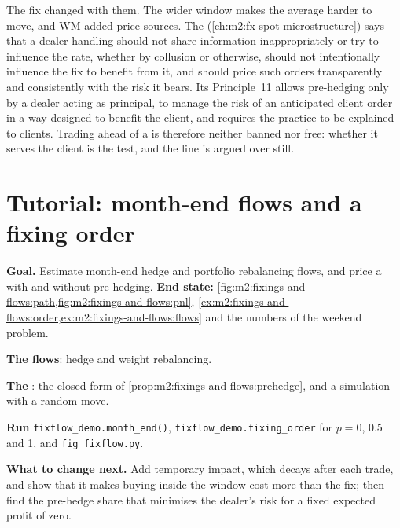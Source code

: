 The fix changed with them. The wider window makes the average harder to move,
and WM added price sources. The 
(\cref{ch:m2:fx-spot-microstructure}) says that a dealer handling 
should not share information inappropriately or try to influence the rate,
whether by collusion or otherwise, should not intentionally influence the fix
to benefit from it, and should price such orders transparently and consistently
with the risk it bears. Its Principle~11 allows pre-hedging only by a dealer
acting as principal, to manage the risk of an anticipated client order in a way
designed to benefit the client, and requires the practice to be explained to
clients. Trading ahead of a  is therefore neither banned nor free:
whether it serves the client is the test, and the line is argued over still.

\section{Tutorial: month-end flows and a fixing order}\label{tut:m2:fixings-and-flows:flows}

\begin{tutorial}
\textbf{Goal.} Estimate month-end hedge and portfolio rebalancing flows, and
price a  with and without pre-hedging. \textbf{End state:}
\cref{fig:m2:fixings-and-flows:path,fig:m2:fixings-and-flows:pnl},
\cref{ex:m2:fixings-and-flows:order,ex:m2:fixings-and-flows:flows} and the
numbers of the weekend problem.
\begin{tutsteps}
\item \textbf{The flows}: hedge and weight rebalancing.
\label{lst:m2:fixings-and-flows:flows}
\item \textbf{The }: the closed form of
\cref{prop:m2:fixings-and-flows:prehedge}, and a simulation with a random move.
\label{lst:m2:fixings-and-flows:fix}
\item \textbf{Run} \texttt{fixflow\_demo.month\_end()},
\texttt{fixflow\_demo.fixing\_order} for $p = 0$, 0.5 and 1, and
\texttt{fig\_fixflow.py}.
\end{tutsteps}
\textbf{What to change next.} Add temporary impact, which decays after each
trade, and show that it makes buying inside the window cost more than the fix;
then find the pre-hedge share that minimises the dealer's risk for a fixed
expected profit of zero.
\end{tutorial}

